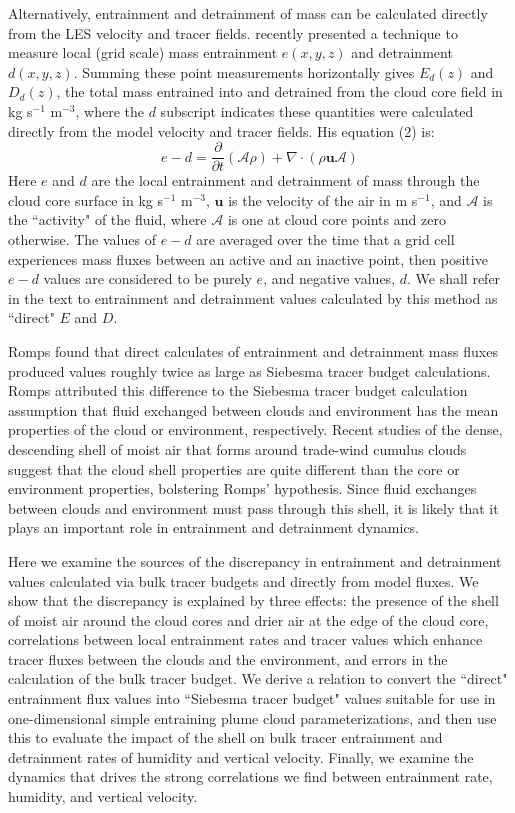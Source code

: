 \documentclass[12pt]{article}
\begin{document}
Alternatively, entrainment and detrainment of mass can be calculated directly
from the LES velocity and tracer fields.  \cite{Romps2010} recently presented a 
technique to measure local (grid scale) mass entrainment $e(x,y,z)$ and
detrainment $d(x,y,z)$.  Summing these point measurements horizontally gives 
$E_d(z)$ and $D_d(z)$, the total mass entrained into and detrained from the
cloud core field in kg s$^{-1}$ m$^{-3}$, where the $d$ subscript indicates 
these quantities were calculated directly from the model velocity and tracer
fields.  His equation (2) is:
\begin{equation}
  \label{eq:romps_e_minus_d}
  e - d = \frac{\partial}{\partial t}(\mathcal{A}\rho) 
        + \nabla \cdot (\rho \mathbf{u} \mathcal{A}) 
\end{equation}
Here $e$ and $d$ are the local entrainment and detrainment of mass through the 
cloud core surface in kg s$^{-1}$ m$^{-3}$, $\mathbf{u}$ is the velocity of the 
air in m s$^{-1}$, and $\mathcal{A}$ is the ``activity" of the fluid, where 
$\mathcal{A}$ is one at cloud core points and zero otherwise.  The values of 
$e - d$ are averaged over the time that a grid cell experiences mass fluxes
between an active and an inactive point, then positive $e-d$ values are
considered to be purely $e$, and negative values, $d$.  We shall refer in the text to entrainment and detrainment values calculated by this method as ``direct"
$E$ and $D$.

Romps found that direct calculates of entrainment and detrainment mass fluxes
produced values roughly twice as large as Siebesma tracer budget calculations.  Romps attributed this difference to the Siebesma tracer budget calculation assumption that fluid exchanged between clouds and environment has the mean
properties of the cloud or environment, respectively.  Recent studies of the
dense, descending shell of moist air that forms around trade-wind cumulus clouds
\citep{Heus2008, Wang2010} suggest that the cloud shell properties are quite
different than the core or environment properties, bolstering Romps' hypothesis.
Since fluid exchanges between clouds and environment must pass through this
shell, it is likely that it plays an important role in entrainment and
detrainment dynamics.

Here we examine the sources of the discrepancy in entrainment and detrainment
values calculated via bulk tracer budgets and directly from model fluxes.  We
show that the discrepancy is explained by three effects: the presence of the
shell of moist air around the cloud cores and drier air at the edge of the 
cloud core, correlations between local entrainment rates and tracer values 
which enhance tracer fluxes between the clouds and the environment, and errors 
in the calculation of the bulk tracer budget.  We derive a relation to convert 
the ``direct" entrainment flux values into ``Siebesma tracer budget" values 
suitable for use in one-dimensional simple entraining plume cloud
parameterizations, and then use this to evaluate the impact of the shell on 
bulk tracer entrainment and detrainment rates of humidity and vertical 
velocity.  Finally, we examine the dynamics that drives the strong correlations
we find between entrainment rate, humidity, and vertical velocity.
\end{document}
